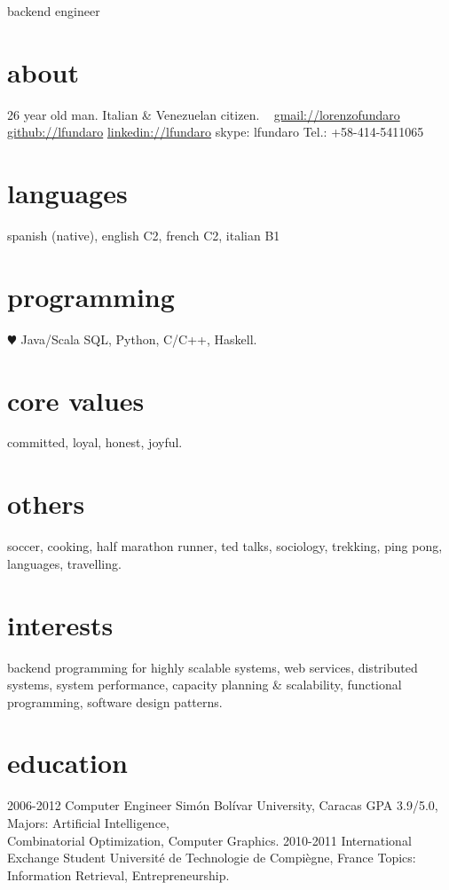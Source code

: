 \documentclass[]{friggeri-cv}
\begin{document}
       {backend engineer}


\begin{aside}
  \section{about}
    26 year old man.
    Italian \& Venezuelan citizen.
    ~
    \href{mailto:lorenzofundaro@gmail.com}{gmail://lorenzofundaro}
    \href{http://github.com/lfundaro}{github://lfundaro}
    \href{http://ve.linkedin.com/in/lfundaro/}{linkedin://lfundaro}
    skype: lfundaro
    Tel.: +58-414-5411065
  \section{languages}
    spanish (native),
   english C2, french C2,
   italian B1
  \section{programming}
    {\color{red} $\varheartsuit$} Java/Scala
    SQL, Python, C/C++, Haskell.
   \section{core values}
    committed, loyal, 
    honest, joyful.
   \section{others}
   soccer, cooking,
   half marathon runner, 
   ted talks, sociology,
   trekking, ping pong,
   languages, travelling.
\end{aside}

\section{interests}

backend programming for highly scalable systems, web services, distributed systems, system performance, 
capacity planning \& scalability, functional programming, software design patterns.

\section{education}

\begin{entrylist}
  \entry
    {\small 2006-2012}
    {Computer Engineer}
    {Simón Bolívar University, Caracas}
    {GPA 3.9/5.0, Majors: Artiﬁcial Intelligence,\\
     Combinatorial Optimization, Computer Graphics.}
  \entry
    {\small 2010-2011}
    {International Exchange Student}
    {Université de Technologie de Compiègne, France}
    {Topics: Information Retrieval, Entrepreneurship.}
\end{entrylist}
\end{document}
